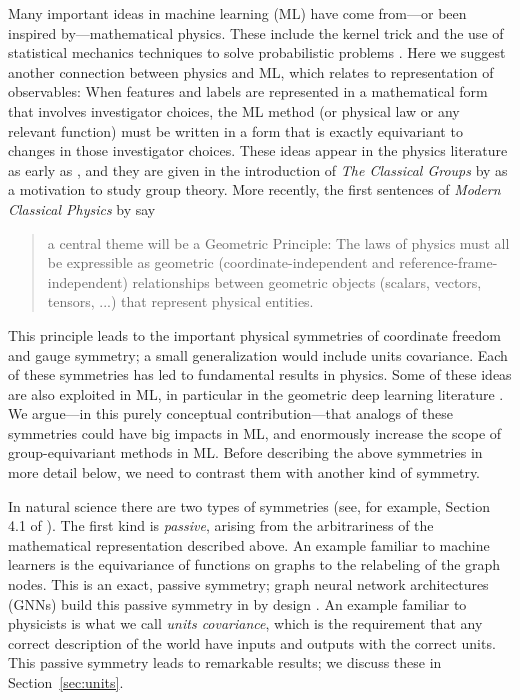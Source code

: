 \documentclass{article}
\theoremstyle{plain}
\theoremstyle{definition}
\theoremstyle{remark}
\newcommand{\sectionname}{Section}
\newcommand{\secref}[1]{\sectionname~\ref{#1}}
\begin{document}
Many important ideas in machine learning (ML) have come from---or been inspired by---mathematical physics.
These include the kernel trick \cite{CouHil53,SchSmo02} and the use of statistical mechanics techniques to solve probabilistic problems \cite{mcmc, gibbs}.
Here we suggest another connection between physics and ML, which relates to representation of observables:
When features and labels are represented in a mathematical form that involves investigator choices, the ML method (or physical law or any relevant function) must be written in a form that is exactly equivariant to changes in those investigator choices.
These ideas appear in the physics literature as early as \citet{gr}, and they are given in the introduction of \textit{The Classical Groups} by \citet{weyl} as a motivation to study group theory.
More recently, the first sentences of \textit{Modern Classical Physics} by \citet{mcp} say
\vspace{-2ex}\begin{quote}
a central theme will be a Geometric Principle: 
The laws of physics must all
be expressible as geometric (coordinate-independent and reference-frame-independent)
relationships between geometric objects (scalars, vectors, tensors, ...) that represent
physical entities.
\end{quote}\vspace{-2ex}
This principle leads to the important physical symmetries of coordinate freedom and gauge symmetry; a small generalization would include units covariance.
Each of these symmetries has led to fundamental results in physics. Some of these ideas are also exploited in ML, in particular in the geometric deep learning literature \cite{bronstein2021geometric}. 
We argue---in this purely conceptual contribution---that analogs of these symmetries could have big impacts in ML, and enormously increase the scope of group-equivariant methods in ML.
Before describing the above symmetries in more detail below, we need to contrast them with another kind of symmetry.  

In natural science there are two types of symmetries (see, for example, Section 4.1 of \citealt{rovelli2000loop}). 
The first kind is \emph{passive}, arising from the arbitrariness of the mathematical representation described above.
An example familiar to machine learners is the equivariance of functions on graphs to the relabeling of the graph nodes.
This is an exact, passive symmetry; graph neural network architectures (GNNs) build this passive symmetry in by design \cite{bruna2013spectral, duvenaud2015convolutional, gilmer2017neural}. 
An example familiar to physicists is what we call \emph{units covariance}, which is the requirement that any correct description of the world have inputs and outputs with the correct units.
This passive symmetry leads to remarkable results; we discuss these in \secref{sec:units}.
\end{document}
